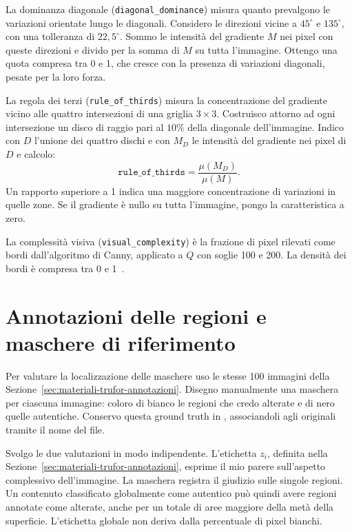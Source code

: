 La dominanza diagonale (\texttt{diagonal\_dominance}) misura quanto prevalgono le variazioni orientate lungo le diagonali. Considero le direzioni vicine a $45^\circ$ e $135^\circ$, con una tolleranza di $22{,}5^\circ$. Sommo le intensità del gradiente $M$ nei pixel con queste direzioni e divido per la somma di $M$ su tutta l'immagine. Ottengo una quota compresa tra 0 e 1, che cresce con la presenza di variazioni diagonali, pesate per la loro forza.

La regola dei terzi (\texttt{rule\_of\_thirds}) misura la concentrazione del gradiente vicino alle quattro intersezioni di una griglia $3\times3$. Costruisco attorno ad ogni intersezione un disco di raggio pari al $10\%$ della diagonale dell'immagine. Indico con $D$ l'unione dei quattro dischi e con $M_D$ le intensità del gradiente nei pixel di $D$ e calcolo:
\begin{equation}
    \texttt{rule\_of\_thirds}=\frac{\mu(M_D)}{\mu(M)}.
    \label{eq:feature-regola-terzi}
\end{equation}
Un rapporto superiore a 1 indica una maggiore concentrazione di variazioni in quelle zone. Se il gradiente è nullo su tutta l'immagine, pongo la caratteristica a zero.

La complessità visiva (\texttt{visual\_complexity}) è la frazione di pixel rilevati come bordi dall'algoritmo di Canny, applicato a $Q$ con soglie 100 e 200. La densità dei bordi è compresa tra 0 e 1~\cite{4767851}.

\newpage
\section{Annotazioni delle regioni e maschere di riferimento}
\label{subsec:materiali-maschere-riferimento}

Per valutare la localizzazione delle maschere uso le stesse 100 immagini della Sezione~\ref{sec:materiali-trufor-annotazioni}. Disegno manualmente una maschera per ciascuna immagine: coloro di bianco le regioni che credo alterate e di nero quelle autentiche. Conservo questa ground truth in , associandoli agli originali tramite il nome del file.

Svolgo le due valutazioni in modo indipendente. L'etichetta $z_i$, definita nella Sezione~\ref{sec:materiali-trufor-annotazioni}, esprime il mio parere sull'aspetto complessivo dell'immagine. La maschera registra il giudizio sulle singole regioni. Un contenuto classificato globalmente come autentico può quindi avere regioni annotate come alterate, anche per un totale di aree maggiore della metà della superficie. L'etichetta globale non deriva dalla percentuale di pixel bianchi.

